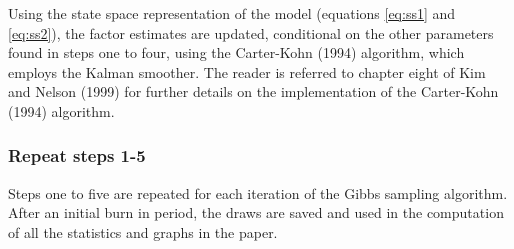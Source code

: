\documentclass[11pt,english,a4paper]{article}
\begin{document}
Using the state space representation of the model (equations \ref{eq:ss1} and \ref{eq:ss2}), the factor estimates are updated, conditional on the other parameters found in steps one to four, using the Carter-Kohn (1994) algorithm, which employs the Kalman smoother. The reader is referred to chapter eight of Kim and Nelson (1999) for further details on the implementation of the Carter-Kohn (1994) algorithm.



\subsubsection*{Repeat steps 1-5}

Steps one to five are repeated for each iteration of the Gibbs sampling algorithm. After an initial burn in period, the draws are saved and used in the computation of all the statistics and graphs in the paper.
\end{document}
